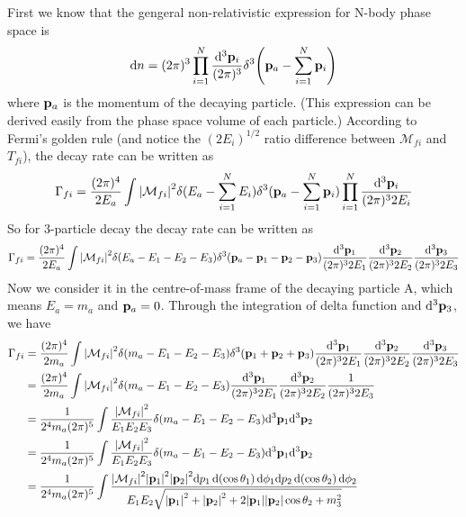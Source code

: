 \documentclass{article}
\begin{document}
\begin{enumerate}[\bf1.]
  First we know that the gengeral non-relativistic expression for N-body phase space is
  \begin{align}
    \dd n=(2\pi)^3 \prod_{i=1}^{N}\frac{\dd^3\vb{p}_i}{(2\pi)^3}\delta^3\pqty{\vb{p}_{a}-\sum_{i=1}^{N}\vb{p}_i}
  \end{align}
  where $\vb{p}_a$ is the momentum of the decaying particle. (This expression can be derived easily from the phase space volume of each particle.) According to Fermi's golden rule (and notice the $(2E_i)^{1/2}$ ratio difference between $\mathcal{M}_{fi}$ and $T_{fi}$), the decay rate can be written as
  \begin{align}
    \Gamma_{fi}=\frac{(2\pi)^4}{2E_a}\int\abs{\mathcal{M}_{fi}}^2\delta(E_a-\sum_{i=1}^NE_i)\delta^3(\vb{p}_a-\sum_{i=1}^N\vb{p}_i)\prod_{i=1}^N\frac{\dd^3\vb{p}_i}{(2\pi)^32E_i}
  \end{align}
  So for 3-particle decay the decay rate can be written as
  \begin{align*}
    \Gamma_{fi}=\frac{(2\pi)^4}{2E_a}\int\abs{\mathcal{M}_{fi}}^2\delta(E_a-E_1-E_2-E_3)\delta^3(\vb{p}_a-\vb{p}_1-\vb{p}_2-\vb{p}_3)\frac{\dd^3\vb{p}_1}{(2\pi)^32E_1}\frac{\dd^3\vb{p}_2}{(2\pi)^32E_2}\frac{\dd^3\vb{p}_3}{(2\pi)^32E_3}
  \end{align*}
  Now we consider it in the centre-of-mass frame of the decaying particle A, which means $E_a=m_a$ and $\vb{p}_a=0$. Through the integration of delta function and $\dd^3\vb{p}_3$, we have
  \begin{align*}
    \Gamma_{fi}&=\frac{(2\pi)^4}{2m_a}\int\abs{\mathcal{M}_{fi}}^2\delta(m_a-E_1-E_2-E_3)\delta^3(\vb{p}_1+\vb{p}_2+\vb{p}_3)\frac{\dd^3\vb{p}_1}{(2\pi)^32E_1}\frac{\dd^3\vb{p}_2}{(2\pi)^32E_2}\frac{\dd^3\vb{p}_3}{(2\pi)^32E_3}\\
    &=\frac{(2\pi)^4}{2m_a}\int\abs{\mathcal{M}_{fi}}^2\delta(m_a-E_1-E_2-E_3)\frac{\dd^3\vb{p}_1}{(2\pi)^32E_1}\frac{\dd^3\vb{p}_2}{(2\pi)^32E_2}\frac{1}{(2\pi)^32E_3}\\
    &=\frac{1}{2^4m_a(2\pi)^5}\int\frac{\abs{\mathcal{M}_{fi}}^2}{E_1E_2E_3}\delta(m_a-E_1-E_2-E_3)\dd^3\vb{p}_1\dd^3\vb{p}_2\\
    &=\frac{1}{2^4m_a(2\pi)^5}\int\frac{\abs{\mathcal{M}_{fi}}^2}{E_1E_2E_3}\delta(m_a-E_1-E_2-E_3)\dd^3\vb{p}_1\dd^3\vb{p}_2\\
    &=\frac{1}{2^4m_a(2\pi)^5}\int\frac{\abs{\mathcal{M}_{fi}}^2\abs{\vb{p}_1}^2\abs{\vb{p}_2}^2\dd p_1\dd(\cos\theta_1)\dd\phi_1\dd p_2\dd(\cos\theta_2)\dd\phi_2}{E_1E_2\sqrt{\abs{\vb{p}_1}^2+\abs{\vb{p}_2}^2+2\abs{\vb{p}_1}\abs{\vb{p}_2}\cos\theta_2+m_3^2}}\\

\end{align*}
\end{enumerate}
\end{document}
